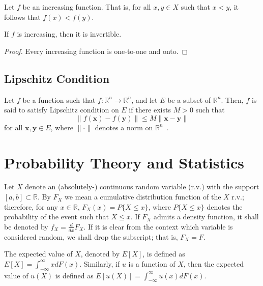 Let $f$ be an increasing function. That is, for all $x,y\in X$ such that $x < y$, it follows that $f(x) < f(y)$.
\begin{corollary}
\label{cor:increasing_invertible_notation}
If $f$ is increasing, then it is invertible.
\end{corollary}
\begin{proof}
Every increasing function is one-to-one and onto.
\end{proof}

\subsection{Lipschitz Condition} %
\label{sub:lipschitz_condition_notation}
Let $f$ be a function such that $f: \mathbb{R}^n \to \mathbb{R}^n$, and let $E$ be a subset of $\mathbb{R}^n$. Then, $f$ is said to satisfy Lipschitz condition on $E$ if there exists $M>0$ such that
\begin{equation}
	\|f(\mathbf{x}) - f(\mathbf{y})\| \leq M \| \mathbf{x} - \mathbf{y} \|
\end{equation}
for all $\mathbf{x},\mathbf{y}\in E$, where $\|\cdot\|$ denotes a norm on $\mathbb{R}^n$~\cite{HubbardPaarsch2011,SteinShakarchiCH7}.

\section{Probability Theory and Statistics} %
\label{sec:probability_notation}
Let $X$ denote an (absolutely-) continuous random variable (r.v.) with the support $[a, b]\subset\mathbb{R}$. By $F_{X}$ we mean a cumulative distribution function of the $X$ r.v.; therefore, for any $x\in\mathbb{R}$, $F_{X}(x) = P\{X \le x\}$, where $P\{X\le x\}$ denotes the probability of the event such that $X\le x$. If $F_{X}$ admits a density function, it shall be denoted by $f_{X} = \frac{d}{dx}F_{X}$. If it is clear from the context which variable is considered random, we shall drop the subscript; that is, $F_{X}= F$.

The expected value of $X$, denoted by $E[X]$, is defined as $E[X] = \int_{-\infty}^{\infty} xdF(x)$. Similarly, if $u$ is a function of $X$, then the expected value of $u(X)$ is defined as $E[u(X)] = \int_{-\infty}^{\infty} u(x)dF(x)$.

